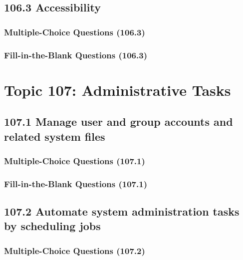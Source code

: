 \documentclass[a4paper]{report}
\begin{document}
\subsection*{106.3 Accessibility}
\subsubsection*{Multiple-Choice Questions (106.3)}

\subsubsection*{Fill-in-the-Blank Questions (106.3)}


\section*{Topic 107: Administrative Tasks}

\subsection*{107.1 Manage user and group accounts and related system files}
\subsubsection*{Multiple-Choice Questions (107.1)}

\subsubsection*{Fill-in-the-Blank Questions (107.1)}

\subsection*{107.2 Automate system administration tasks by scheduling jobs}
\subsubsection*{Multiple-Choice Questions (107.2)}
\end{document}
